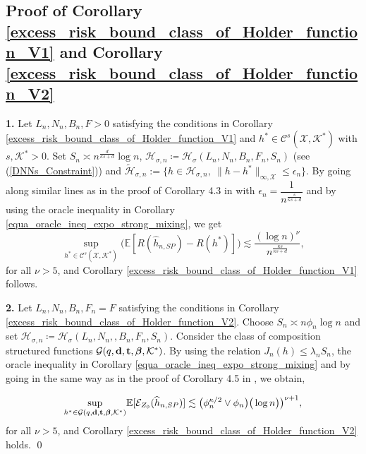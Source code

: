 \documentclass[10pt,twoside]{article}
\numberwithin{equation}{section}
\newcommand{\E}{\ensuremath{\mathbb{E}}}
\newcommand{\mk}{ { \mathcal{K}} }
\newcommand{\mx}{ { \mathcal{X}} }
\begin{document}
\subsection{Proof of Corollary \ref{excess_risk_bound_class_of_Holder_function_V1} and Corollary \ref{excess_risk_bound_class_of_Holder_function_V2}}
%
\textbf{1.} Let $L_n, N_n, B_n, F >0$ satisfying the conditions in Corollary \ref{excess_risk_bound_class_of_Holder_function_V1} and $h^{*} \in  \mathcal{C}^{s}(\mathcal{X}, \mathcal{K}^{*})$ with $s, \mk^{*} >0$. 
 Set $S_n \asymp n^{\frac{d}{\kappa s + d} } \log n$, $\mathcal{H}_{\sigma, n} \coloneqq \mathcal{H}_{\sigma}(L_n, N_n, B_n, F_n, S_n)$ (see (\ref{DNNs_Constraint})) 
 and 
%
$ \widetilde{\mathcal{H}}_{\sigma, n} := \{h \in  \mathcal{H}_{\sigma,n}, ~ \|h - h^*\|_{\infty, \mx}  \leq \epsilon_n\} $.
%
By going along similar lines as in the proof of Corollary 4.3 in \cite{kengne2025deep} with $\epsilon_n = \dfrac{ 1}{ n^{\frac{s}{\kappa s + d}} }$ and by using the oracle inequality in Corollary \ref{equa_oracle_ineq_expo_strong_mixing}, we get
%
\[  \sup_{h^{*} \in \mathcal{C}^{s}(\mathcal{X}, \mathcal{K}^{*}) } \Big(  \E[R(\widehat{h}_{n,SP}) - R(h^{*})] \Big) \lesssim \dfrac{(\log n )^{\nu}}{n^{\frac{\kappa s}{\kappa s + d}} }, \]
%
for all $\nu > 5$, and Corollary \ref{excess_risk_bound_class_of_Holder_function_V1} follows.
%

\medskip

\noindent
\textbf{2.}
Let $L_n, N_n, B_n, F_n = F$ satisfying the conditions in Corollary \ref{excess_risk_bound_class_of_Holder_function_V2}.
%
Choose $S_n \asymp  n \phi_{n} \log n$ and set  $\mathcal{H}_{\sigma, n} \coloneqq \mathcal{H}_{\sigma}(L_n, N_n,, B_n, F_n, S_n)$.
%
Consider the class of composition structured functions $\mathcal{G}(q, \bold{d}, \bold{t}, \boldsymbol{\beta}, \mk^{*})$.
By using the relation $J_n(h) \leq \lambda_n S_n$, the oracle inequality in Corollary \ref{equa_oracle_ineq_expo_strong_mixing} and by going in the same way as in the proof of Corollary 4.5 in \cite{kengne2025deep}, we obtain,
%

\[  \underset{h^{*} \in \mathcal{G}(q, \bold{d}, \bold{t}, \boldsymbol{\beta}, \mk^{*})}{\sup} \E[\mathcal{E}_{Z_0}(\widehat{h}_{n,SP}) ] \lesssim  \big( \phi_n ^{\kappa/2} \lor \phi_n \big) \big(\log n \big) \big)^{\nu + 1}, \]
%
for all $\nu > 5$, and Corollary \ref{excess_risk_bound_class_of_Holder_function_V2} holds.
%
\qed

 
\end{document}
